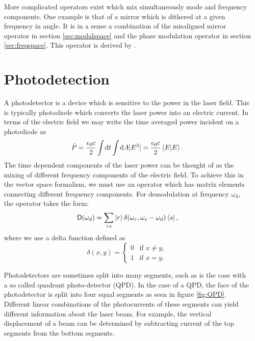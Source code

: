 More complicated operators exist which mix simultaneously mode and frequency components. %
One example is that of a mirror which is dithered at a given frequency in angle. %
It is in a sense a combination of the misaligned mirror operator in section \ref{sec:modalspace} and the phase modulation operator in section \ref{sec:freqspace}. %
This operator is derived by \citet{Sigg:00}.
\section{Photodetection}
A photodetector is a device which is sensitive to the power in the laser field. %
This is typically photodiode which converts the laser power into an electric current. %
In terms of the electric field we may write the time averaged power incident on a photodiode as
\begin{equation}
\bar{P}=\frac{\epsilon_0 c}{2}\int \! \! \dd t \int \! \! \dd A|E^2|=\frac{\epsilon_0 c}{2}\inprod{E}{E}.
\end{equation}
The time dependent components of the laser power can be thought of as the mixing of different frequency components of the electric field. %
To achieve this in the vector space formalism, we must use an operator which has matrix elements connecting different frequency components. %
For demodulation at frequency $\omega_d$, the  operator takes the form: 
\begin{equation}
\mathsf{D}(\omega_d) = \sum_{rs} \left| r \right> \delta(\omega_r,\omega_s-\omega_d) \left< s \right|,
\end{equation}
where we use a delta function defined as
\begin{equation}
\delta(x,y) = 
\begin{cases}
0 & \text{if $x \neq y$}, \\
1 & \text{if $x = y$}.
\end{cases}
\end{equation}


Photodetectors are sometimes split into many segments, such as is the case with a so called quadrant photo-detector (QPD). %
In the case of a QPD, the face of the photodetector is split into four equal segments as seen in figure \ref{fig:QPD}. %
 Different linear combinations of the photocurrents of these segments can yield different information about the laser beam. %
For example, the vertical displacement of a beam can be determined by subtracting current of the top segments from the bottom segments.

